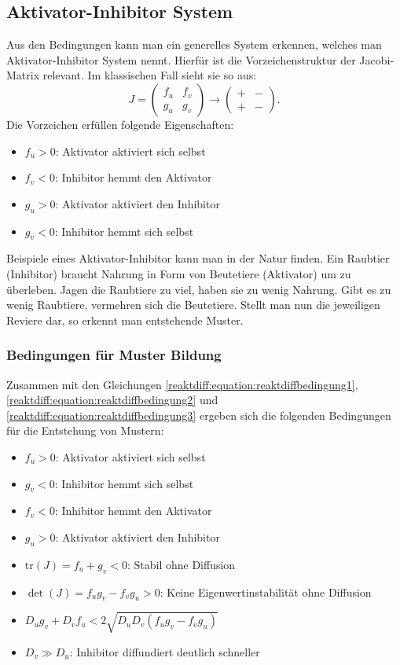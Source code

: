 \subsection{Aktivator-Inhibitor System}
Aus den Bedingungen kann man ein generelles System erkennen, welches man Aktivator-Inhibitor System nennt.
Hierfür ist die Vorzeichenstruktur der Jacobi-Matrix relevant.
Im klassischen Fall sieht sie so aus:
\begin{equation*}
        J =
    \begin{pmatrix}
        f_u & f_v\\
        g_u & g_v
    \end{pmatrix} 
    \rightarrow
    \begin{pmatrix}
        + & -\\
        + & -
    \end{pmatrix}.
\end{equation*}
Die Vorzeichen erfüllen folgende Eigenschaften:
\begin{itemize}
    \item \(f_u > 0\): Aktivator aktiviert sich selbst
    \item \(f_v < 0\): Inhibitor hemmt den Aktivator
    \item \(g_u > 0\): Aktivator aktiviert den Inhibitor
    \item \(g_v < 0\): Inhibitor hemmt sich selbst
\end{itemize}
Beispiele eines Aktivator-Inhibitor kann man in der Natur finden.
Ein Raubtier (Inhibitor) braucht Nahrung in Form von Beutetiere (Aktivator) um zu überleben.
Jagen die Raubtiere zu viel, haben sie zu wenig Nahrung.
Gibt es zu wenig Raubtiere, vermehren sich die Beutetiere.
Stellt man nun die jeweiligen Reviere dar, so erkennt man entstehende Muster.

\subsubsection{Bedingungen für Muster Bildung}
Zusammen mit den Gleichungen \eqref{reaktdiff:equation:reaktdiffbedingung1},\eqref{reaktdiff:equation:reaktdiffbedingung2} und \eqref{reaktdiff:equation:reaktdiffbedingung3} ergeben sich die folgenden Bedingungen für die Entstehung von Mustern:
        \begin{itemize}
            \item \(f_u > 0\): Aktivator aktiviert sich selbst
            \item \(g_v < 0\): Inhibitor hemmt sich selbst
            \item \(f_v < 0\): Inhibitor hemmt den Aktivator
            \item \(g_u > 0\): Aktivator aktiviert den Inhibitor
            \item \(\text{tr}(J) = f_u + g_v < 0\): Stabil ohne Diffusion
            \item \(\det(J) = f_u g_v - f_v g_u > 0\): Keine Eigenwertinstabilität ohne Diffusion
            \item \(D_u g_v + D_v f_u < 2\sqrt{D_u D_v (f_u g_v - f_v g_u)}\)
            \item \(D_v \gg D_u\): Inhibitor diffundiert deutlich schneller
        \end{itemize}


